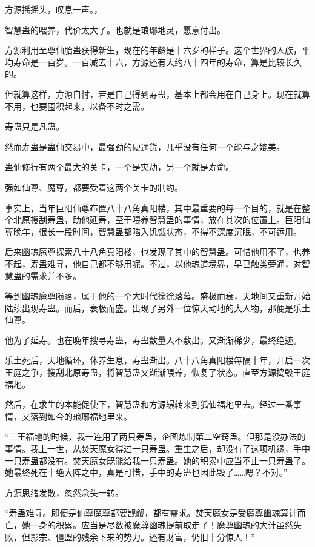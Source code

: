 
\begin{this_body}

方源摇摇头，叹息一声。，

智慧蛊的喂养，代价太大了。也就是琅琊地灵，愿意付出。

方源利用至尊仙胎蛊获得新生，现在的年龄是十六岁的样子。这个世界的人族，平均寿命是一百岁。一百减去十六，方源还有大约八十四年的寿命，算是比较长久的。

但就算这样，方源自忖，若是自己得到寿蛊，基本上都会用在自己身上。现在就算不用，也要囤积起来，以备不时之需。

寿蛊只是凡蛊。

然而寿蛊是蛊仙交易中，最强劲的硬通货，几乎没有任何一个能与之媲美。

蛊仙修行有两个最大的关卡，一个是灾劫，另一个就是寿命。

强如仙尊、魔尊，都要受着这两个关卡的制约。

事实上，当年巨阳仙尊布置八十八角真阳楼，其中最重要的每一个目的，就是在整个北原搜刮寿蛊，助他延寿，至于喂养智慧蛊的事情，放在其次的位置上。巨阳仙尊晚年，很长一段时间，智慧蛊都陷入饥饿状态，不得不深度沉眠，不可运用。

后来幽魂魔尊探索八十八角真阳楼，也发现了其中的智慧蛊。可惜他用不了，也养不起，寿蛊难寻，他自己都不够用呢。不过，以他魂道境界，早已触类旁通，对智慧蛊的需求并不多。

等到幽魂魔尊陨落，属于他的一个大时代徐徐落幕。盛极而衰，天地间又重新开始陆续出现寿蛊。而后，衰极而盛。出现了另外一位惊天动地的大人物，那便是乐土仙尊。

他为了延寿。也在晚年搜寻寿蛊，寿蛊数量入不敷出。又渐渐稀少，最终绝迹。

乐土死后，天地循环，休养生息，寿蛊渐出。八十八角真阳楼每隔十年，开启一次王庭之争，搜刮北原寿蛊，将智慧蛊又渐渐喂养，恢复了状态。直至方源捣毁王庭福地。

然后，在求生的本能促使下，智慧蛊和方源辗转来到狐仙福地里去。经过一番事情，又落到如今的琅琊福地里来。

“三王福地的时候，我一连用了两只寿蛊，企图炼制第二空窍蛊。但那是没办法的事情。我上一世，从焚天魔女得过一只寿蛊。重生之后，却没有了这项机缘，手中一只寿蛊都没有。焚天魔女既能给我一只寿蛊。她的积累中应当不止一只寿蛊了。她最终死在十绝大阵之中，真是可惜，手中的寿蛊也因此毁了……嗯？不对。”

方源思绪发散，忽然念头一转。

“寿蛊难寻。即便是仙尊魔尊都要觊觎，都有需求。焚天魔女是受魔尊幽魂算计而亡，她一身的积累。应当是尽数被魔尊幽魂提前取走了！魔尊幽魂的大计虽然失败，但影宗、僵盟的残余下来的势力。还有财富，仍旧十分惊人！”


\end{this_body}
